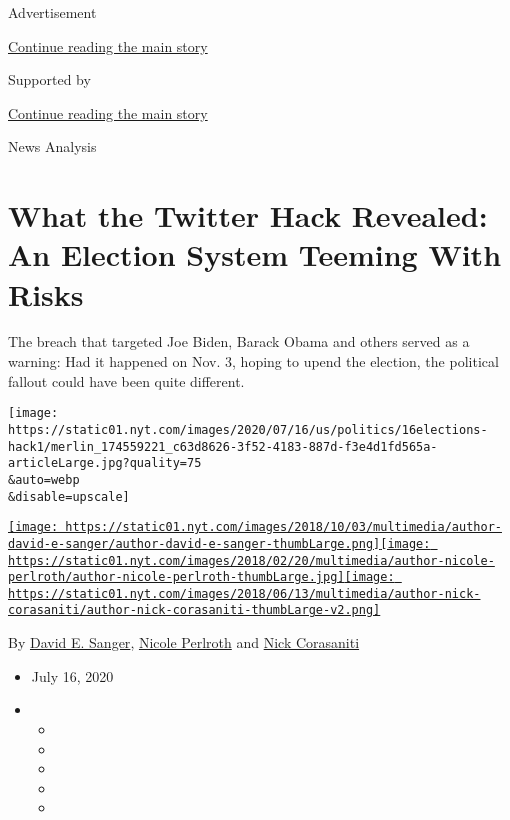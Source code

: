 Advertisement

\protect\hyperlink{after-top}{Continue reading the main story}

Supported by

\protect\hyperlink{after-sponsor}{Continue reading the main story}

News Analysis

\hypertarget{what-the-twitter-hack-revealed-an-election-system-teeming-with-risks}{%
\section{What the Twitter Hack Revealed: An Election System Teeming With
Risks}\label{what-the-twitter-hack-revealed-an-election-system-teeming-with-risks}}

The breach that targeted Joe Biden, Barack Obama and others served as a
warning: Had it happened on Nov. 3, hoping to upend the election, the
political fallout could have been quite different.

\texttt{[image: https://static01.nyt.com/images/2020/07/16/us/politics/16elections-hack1/merlin\_174559221\_c63d8626-3f52-4183-887d-f3e4d1fd565a-articleLarge.jpg?quality=75\\\&auto=webp\\\&disable=upscale]}

\href{https://www.nytimes.com/by/david-e-sanger}{\texttt{[image: https://static01.nyt.com/images/2018/10/03/multimedia/author-david-e-sanger/author-david-e-sanger-thumbLarge.png]}}\href{https://www.nytimes.com/by/nicole-perlroth}{\texttt{[image: https://static01.nyt.com/images/2018/02/20/multimedia/author-nicole-perlroth/author-nicole-perlroth-thumbLarge.jpg]}}\href{https://www.nytimes.com/by/nick-corasaniti}{\texttt{[image: https://static01.nyt.com/images/2018/06/13/multimedia/author-nick-corasaniti/author-nick-corasaniti-thumbLarge-v2.png]}}

By \href{https://www.nytimes.com/by/david-e-sanger}{David E. Sanger},
\href{https://www.nytimes.com/by/nicole-perlroth}{Nicole Perlroth} and
\href{https://www.nytimes.com/by/nick-corasaniti}{Nick Corasaniti}

\begin{itemize}
\item
  July 16, 2020
\item
  \begin{itemize}
  \item
  \item
  \item
  \item
  \item
  \end{itemize}
\end{itemize}

